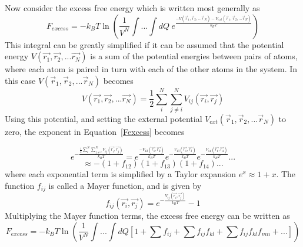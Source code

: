 \documentclass[12pt]{article}
\begin{document}
Now consider the excess free energy which is written most generally as
\begin{equation}\label{Fexcess-mostgeneral}{F_{excess}= -k_BT\ln{\left(\frac{1}{V^N}\int{...}\int{dQ}~e^\frac{-V(\vec{r}_1, \vec{r}_2,...\vec{r}_N)-V_{ext}(\vec{r}_1, \vec{r}_2,...\vec{r}_N)}{k_BT}\right)}}\end{equation} 
This integral can be greatly simplified if it can be assumed that the potential energy $V(\vec{r_1},\vec{r_2},...\vec{r_N})$ is a sum of the potential energies between pairs of atoms, where each atom is paired in turn with each of the other atoms in the system. In this case $V(\vec{r}_1, \vec{r}_2,...\vec{r}_N)$ becomes 
\begin{equation}{V(\vec{r_1},\vec{r_2},...\vec{r_N})=\frac{1}{2}\sum^N_i\sum^N_{j\neq{i}}V_{ij}(\vec{r_i},\vec{r_j})}\end{equation} 
Using this potential, and setting the external potential $V_{ext}(\vec{r}_1, \vec{r}_2,...\vec{r}_N)$ to zero, the exponent in Equation~\ref{Fexcess} becomes

\begin{displaymath}{e^{-\frac{\frac{1}{2}\sum^N_i\sum^N_{j\neq{i}}V_{ij}(\vec{r_i},\vec{r_j})}{k_BT}}=e^{\frac{-V_{12}(\vec{r_1},\vec{r_2})}{k_BT}}e^{-\frac{V_{13}(\vec{r_1},\vec{r_3})}{k_BT}}e^{-\frac{V_{14}(\vec{r_1},\vec{r_4})}{k_BT}}...}\end{displaymath}    \begin{equation}{\approx-(1+f_{12})(1+f_{13})(1+f_{14})...}\end{equation}
where each exponential term is simplified by a Taylor expansion $e^x\approx{1+x}$. %
The function $f_{ij}$ is called a Mayer function, and is given by
\begin{equation}{f_{ij}(\vec{r_i},\vec{r_j})=e^{-\frac{V_{ij}(\vec{r_i},\vec{r_j})}{k_BT}}-1}\end{equation} 
Multiplying the Mayer function terms, the excess free energy can be written as
\begin{equation}\label{Fexcess-simplified}{F_{excess}=-k_BT\ln{\left(\frac{1}{V^N}\int{...}\int{dQ}\left[1 + \sum{f_{ij}} + \sum{f_{ij}f_{kl}} +\sum{f_{ij}f_{kl}f_{mn}} +... \right]\right)  }}\end{equation}
\end{document}
